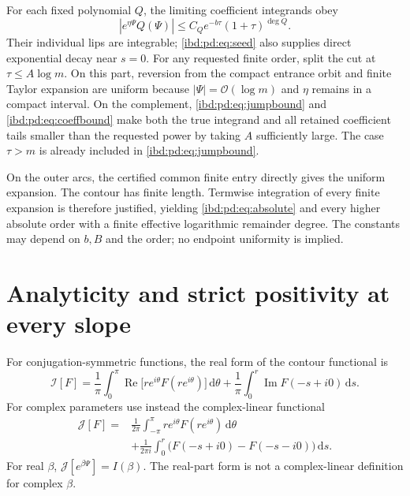 \documentclass[11pt,letterpaper]{article}
\theoremstyle{remark}\newtheorem{remark}[theorem]{Remark}
\newcommand{\I}{\mathcal I}
\newcommand{\J}{\mathcal J}
\newcommand{\dd}{\,\mathrm d}
\newcommand{\Oh}{\mathcal O}
\DeclareMathOperator{\Rea}{Re}
\DeclareMathOperator{\Ima}{Im}
\begin{document}
For each fixed polynomial $Q$, the limiting coefficient integrands obey
\begin{equation}\label{ibd:pd:eq:coeffbound}
 |e^{\eta\Psi}Q(\Psi)|\leq C_Qe^{-b\tau}(1+\tau)^{\deg Q}.
\end{equation}
Their individual lips are integrable; \eqref{ibd:pd:eq:seed} also supplies direct exponential decay near $s=0$. For any requested finite order, split the cut at $\tau\leq A\log m$. On this part, reversion from the compact entrance orbit and finite Taylor expansion are uniform because $|\Psi|=\Oh(\log m)$ and $\eta$ remains in a compact interval. On the complement, \eqref{ibd:pd:eq:jumpbound} and \eqref{ibd:pd:eq:coeffbound} make both the true integrand and all retained coefficient tails smaller than the requested power by taking $A$ sufficiently large. The case $\tau>m$ is already included in \eqref{ibd:pd:eq:jumpbound}.

On the outer arcs, the certified common finite entry directly gives the uniform expansion. The contour has finite length. Termwise integration of every finite expansion is therefore justified, yielding \eqref{ibd:pd:eq:absolute} and every higher absolute order with a finite effective logarithmic remainder degree. The constants may depend on $b,B$ and the order; no endpoint uniformity is implied.

\section{Analyticity and strict positivity at every slope}\label{ibd:pd:sec:positivity}
For conjugation-symmetric functions, the real form of the contour functional is
\begin{equation}\label{ibd:pd:eq:realI}
 \I[F]=\frac1\pi\int_0^\pi\Rea\bigl[r e^{i\theta}F(re^{i\theta})\bigr]\dd\theta
 +\frac1\pi\int_0^r\Ima F(-s+i0)\dd s.
\end{equation}
For complex parameters use instead the complex-linear functional
\begin{align}\label{ibd:pd:eq:complexJ}
 \J[F]={}&\frac1{2\pi}\int_{-\pi}^{\pi}r e^{i\theta}F(re^{i\theta})\dd\theta\\
 &+\frac1{2\pi i}\int_0^r\bigl(F(-s+i0)-F(-s-i0)\bigr)\dd s.\nonumber
\end{align}
For real $\beta$, $\J[e^{\beta\Psi}]=I(\beta)$. The real-part form is not a complex-linear definition for complex $\beta$.
\end{document}

